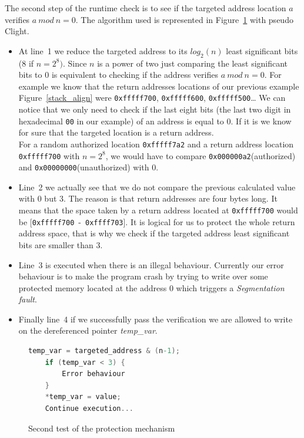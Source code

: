 \documentclass[11pt]{sdm}
\begin{document}
The second step of the runtime check is to see if the targeted address location $a$ verifies $a~mod~n=0$.
The algorithm used is represented in Figure~\ref{classic_check} with pseudo Clight.
\begin{itemize}
	\item At line~1 we reduce the targeted address to its $log_2(n)$ least significant bits (8 if $n=2^8)$.
Since $n$ is a power of two just comparing the least significant bits to $0$ is equivalent to checking if the address verifies $a~mod~n=0$.
For example we know that the return addresses locations of our previous example Figure~\ref{stack_align} were \texttt{0xfffff700}, \texttt{0xfffff600}, \texttt{0xfffff500}\dots
We can notice that we only need to check if the last eight bits (the last two digit in hexadecimal \texttt{00} in our example) of an address is equal to 0.
If it is we know for sure that the targeted location is a return address.\\
For a random authorized location \texttt{0xfffff7a2} and a return address location \texttt{0xfffff700} with $n=2^8$, we would have to compare \texttt{0x000000a2}(authorized) and \texttt{0x00000000}(unauthorized) with $0$. 
	\item Line~2 we actually see that we do not compare the previous calculated value with 0 but 3. The reason is that return addresses are four bytes long.
		It means that the space taken by a return address located at \texttt{0xfffff700} would be [\texttt{0xfffff700}~-~\texttt{0xffff703}]. It is logical for us to protect the whole return address space, that is why we check if the targeted address least significant bits are smaller than 3.
	\item Line~3 is executed when there is an illegal behaviour. Currently our error behaviour is to make the program crash by trying to write over some protected memory located at the address 0 which triggers a \textit{Segmentation fault}.
	\item Finally line~4 if we successfully pass the verification we are allowed to write on the dereferenced pointer \textit{temp\_var}.
\end{itemize}

\begin{figure}[!ht]
\centering
\begin{lstlisting}[language=C]
	temp_var = targeted_address & (n-1);
	if (temp_var < 3) {
		Error behaviour
	} 
	*temp_var = value;
	Continue execution...
\end{lstlisting}
\caption{Second test of the protection mechanism}
\label{classic_check}
\end{figure}
\end{document}
